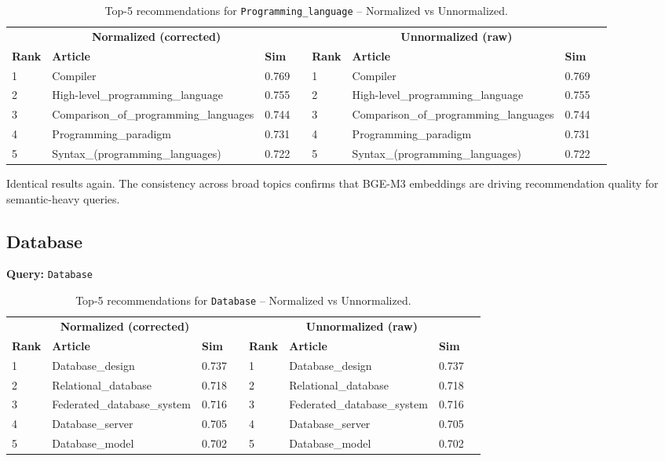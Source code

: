 \documentclass[12pt,a4paper]{article}
\begin{document}
\begin{table}[H]
\centering
\caption{Top-5 recommendations for \texttt{Programming\_language} -- Normalized vs Unnormalized.}
\label{tab:pl}
\begin{tabular}{lllr|lllr}
\toprule
\multicolumn{4}{c}{\textbf{Normalized (corrected)}} & \multicolumn{4}{c}{\textbf{Unnormalized (raw)}} \\
\cmidrule(lr){1-4}\cmidrule(lr){5-8}
\textbf{Rank} & \textbf{Article} & \textbf{Sim} & & \textbf{Rank} & \textbf{Article} & \textbf{Sim} \\
\midrule
1 & Compiler & 0.769 & & 1 & Compiler & 0.769 \\
2 & High-level\_programming\_language & 0.755 & & 2 & High-level\_programming\_language & 0.755 \\
3 & Comparison\_of\_programming\_languages & 0.744 & & 3 & Comparison\_of\_programming\_languages & 0.744 \\
4 & Programming\_paradigm & 0.731 & & 4 & Programming\_paradigm & 0.731 \\
5 & Syntax\_(programming\_languages) & 0.722 & & 5 & Syntax\_(programming\_languages) & 0.722 \\
\bottomrule
\end{tabular}
\end{table}

Identical results again.  The consistency across broad topics confirms that
BGE-M3 embeddings are driving recommendation quality for semantic-heavy queries.

\subsection{Database}

\textbf{Query:} \texttt{Database}

\begin{table}[H]
\centering
\caption{Top-5 recommendations for \texttt{Database} -- Normalized vs Unnormalized.}
\label{tab:db}
\begin{tabular}{lllr|lllr}
\toprule
\multicolumn{4}{c}{\textbf{Normalized (corrected)}} & \multicolumn{4}{c}{\textbf{Unnormalized (raw)}} \\
\cmidrule(lr){1-4}\cmidrule(lr){5-8}
\textbf{Rank} & \textbf{Article} & \textbf{Sim} & & \textbf{Rank} & \textbf{Article} & \textbf{Sim} \\
\midrule
1 & Database\_design & 0.737 & & 1 & Database\_design & 0.737 \\
2 & Relational\_database & 0.718 & & 2 & Relational\_database & 0.718 \\
3 & Federated\_database\_system & 0.716 & & 3 & Federated\_database\_system & 0.716 \\
4 & Database\_server & 0.705 & & 4 & Database\_server & 0.705 \\
5 & Database\_model & 0.702 & & 5 & Database\_model & 0.702 \\
\bottomrule
\end{tabular}
\end{table}
\end{document}
